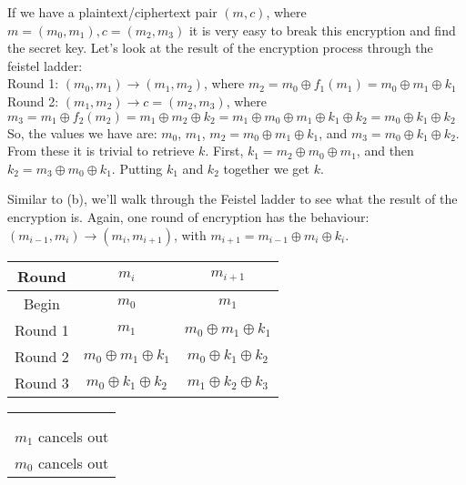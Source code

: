 \documentclass[12pt]{article}
\begin{document}
\begin{list}{.}{}
\begin{list}{()}{}
\item If we have a plaintext/ciphertext pair $(m, c)$, where $m = (m_0, m_1), c
= (m_2, m_3)$ it is very easy to break this encryption and find the secret key.
Let's look at the result of the encryption process through the feistel ladder:\\
Round 1: $(m_0, m_1) \rightarrow (m_1, m_2)$, where $m_2 = m_0 \oplus f_1(m_1) =
m_0 \oplus m_1 \oplus k_1$\\
Round 2: $(m_1, m_2) \rightarrow c = (m_2, m_3)$, where $m_3 = m_1 \oplus
f_2(m_2) = m_1 \oplus m_2 \oplus k_2 = m_1 \oplus m_0 \oplus m_1 \oplus k_1
\oplus k_2 = m_0 \oplus k_1 \oplus k_2$\\
So, the values we have are: $m_0$, $m_1$, $m_2 = m_0 \oplus m_1 \oplus k_1$, and
$m_3 = m_0 \oplus k_1 \oplus k_2$.  From these it is trivial to retrieve $k$.
First, $k_1 = m_2 \oplus m_0 \oplus m_1$, and then $k_2 = m_3 \oplus m_0 \oplus
k_1$.  Putting $k_1$ and $k_2$ together we get $k$.
\item Similar to (b), we'll walk through the Feistel ladder to see what the
result of the encryption is.  Again, one round of encryption has the behaviour:
$(m_{i-1}, m_i) \rightarrow (m_i, m_{i+1})$, with $m_{i+1} = m_{i-1} \oplus m_i
\oplus k_i$.
\begin{center}
\begin{tabular}{| c || c | c |}
\hline
\textbf{Round} & \boldmath$m_i$ & \boldmath$m_{i+1}$\\ \hline
Begin & $m_0$ & $m_1$\\ \hline
Round 1 & $m_1$ & $m_0 \oplus m_1 \oplus k_1$\\ \hline
Round 2 & $m_0 \oplus m_1 \oplus k_1$ & $m_0 \oplus k_1 \oplus k_2$\\ \hline
Round 3 & $m_0 \oplus k_1 \oplus k_2$ & $m_1 \oplus k_2 \oplus k_3$\\ \hline
\end{tabular}
\begin{tabular}{c}
\\
\\
\\
$m_1$ cancels out\\
$m_0$ cancels out\\
\end{tabular}
\end{center}


\end{list}
\end{list}
\end{document}
